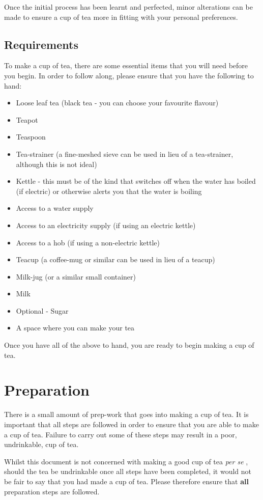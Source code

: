 \documentclass{article}
\begin{document}
Once the initial process has been learnt and perfected, minor alterations can be made to ensure a cup of
tea more in fitting with your personal preferences. 

\subsection{Requirements}

To make a cup of tea, there are some essential items that you will need before you begin. In order to
follow along, please ensure that you have the following to hand:
\bigskip
\begin{itemize}
\item Loose leaf tea (black tea - you can choose your favourite flavour)
\item Teapot
\item Teaspoon
\item Tea-strainer (a fine-meshed sieve can be used in lieu of a tea-strainer, although this
is not ideal)
\item Kettle - this must be of the kind that switches off when the water has boiled
(if electric) or otherwise alerts you that the water is boiling
\item Access to a water supply
\item Access to an electricity supply (if using an electric kettle)
\item Access to a hob (if using a non-electric kettle)
\item Teacup (a coffee-mug or similar can be used in lieu of a teacup)
\item Milk-jug (or a similar small container)
\item Milk
\item Optional - Sugar
\item A space where you can make your tea
\end{itemize}
\noindent
Once you have all of the above to hand, you are ready to begin making a cup of tea.

\section{Preparation}

There is a small amount of prep-work that goes into making a cup of tea. It is important that all
steps are followed in order to ensure that you are able to make a cup of tea. Failure to carry out
some of these steps may result in a poor, undrinkable, cup of tea.

Whilst this document is not concerned with making a good cup of tea {\it per se} , should the tea be
undrinkable once all steps have been completed, it would not be fair to say that you had made a cup of
tea. Please therefore ensure that {\bf all} preparation steps are followed.
\end{document}
